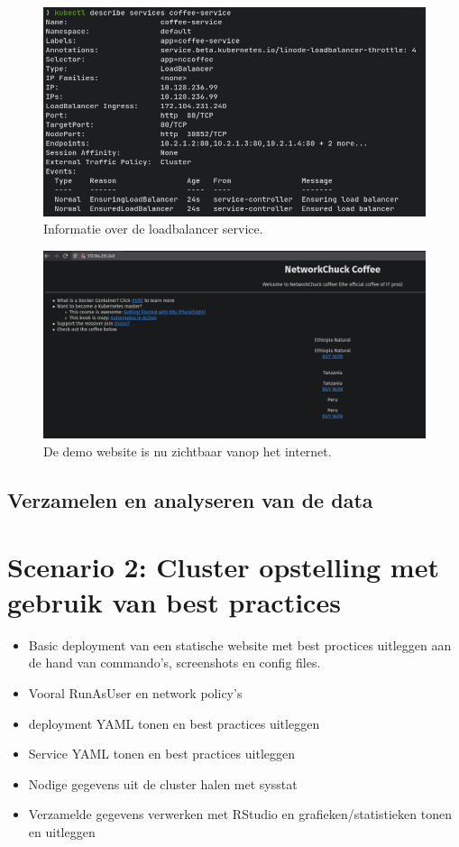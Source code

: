 \begin{figure}[h]
	\centering
	\includegraphics[width=\linewidth]{img/kubectlDescriveService1.png}
	\caption{Informatie over de loadbalancer service.}
	\label{fig:kubectlDescriveService1}
\end{figure}

\begin{figure}[h]
	\centering
	\includegraphics[width=\linewidth]{img/demoSite1.png}
	\caption{De demo website is nu zichtbaar vanop het internet.}
	\label{fig:demoSite1}
\end{figure}

\subsection{Verzamelen en analyseren van de data}

\clearpage
\section{Scenario 2: Cluster opstelling met gebruik van best practices}
\begin{itemize}
	\item Basic deployment van een statische website met best proctices uitleggen aan de hand van commando's, screenshots en config files. 
	\item Vooral RunAsUser en network policy's
	\item deployment YAML tonen en best practices uitleggen
	\item Service YAML tonen en best practices uitleggen
	\item Nodige gegevens uit de cluster halen met sysstat
	\item Verzamelde gegevens verwerken met RStudio en grafieken/statistieken tonen en uitleggen
\end{itemize}


